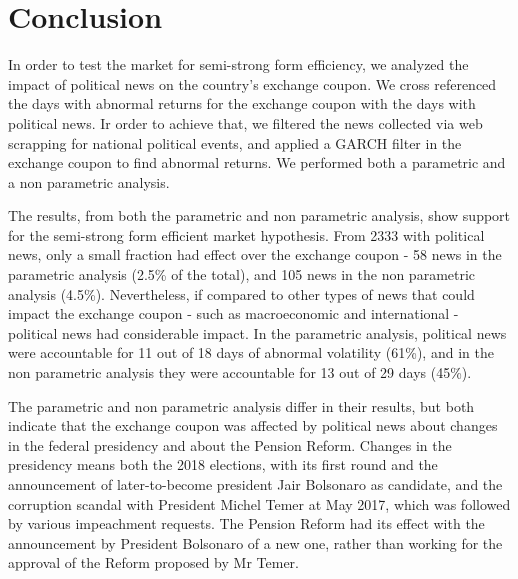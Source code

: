 \documentclass[cic,tc, english]{iiufrgs}
\begin{document}
\chapter{Conclusion} \label{chapter_conclusion}

    In order to test the market for semi-strong form efficiency, we analyzed the impact of political news on the country's exchange coupon. We cross referenced the days with abnormal returns for the exchange coupon with the days with political news. Ir order to achieve that, we filtered the news collected via web scrapping for national political events, and applied a GARCH filter in the exchange coupon to find abnormal returns. We performed both a parametric and a non parametric analysis.

    The results, from both the parametric and non parametric analysis, show support for the semi-strong form efficient market hypothesis. From 2333 with political news, only a small fraction had effect over the exchange coupon - 58 news in the parametric analysis (2.5\% of the total), and 105 news in the non parametric analysis (4.5\%). Nevertheless, if compared to other types of news that could impact the exchange coupon - such as macroeconomic and international - political news had considerable impact. In the parametric analysis, political news were accountable for 11 out of 18 days of abnormal volatility (61\%), and in the non parametric analysis they were accountable for 13 out of 29 days (45\%).

    The parametric and non parametric analysis differ in their results, but both indicate that the exchange coupon was affected by political news about changes in the federal presidency and about the Pension Reform. Changes in the presidency means both the 2018 elections, with its first round and the announcement of later-to-become president Jair Bolsonaro as candidate, and the corruption scandal with President Michel Temer at May 2017, which was followed by various impeachment requests. The Pension Reform had its effect with the announcement by President Bolsonaro of a new one, rather than working for the approval of the Reform proposed by Mr Temer.
\end{document}
